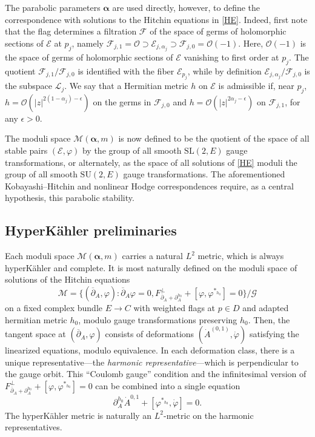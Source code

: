 \documentclass[12pt,letterpaper,reqno]{amsart}
\def\mathbf#1{#1}%
\theoremstyle{remark}
\theoremstyle{definition}
\numberwithin{thm}{section}
\numberwithin{equation}{section}
\numberwithin{figure}{section}
\newcommand{\cL}{\ensuremath{\mathcal L}}
\newcommand{\cF}{\ensuremath{\mathcal F}}
\newcommand{\cO}{\ensuremath{\mathcal O}}
\newcommand{\cE}{{\mathcal E}}
\newcommand{\delbar}{\ensuremath{\overline{\partial}}}
\newcommand{\del}{{\partial}}
\newcommand{\cMam}{\mathcal{M}(\boldsymbol{\alpha}, \mathbf{m})}
\begin{document}
The parabolic parameters $\boldsymbol{\alpha}$ 
are used directly, however, to define the correspondence with solutions to the Hitchin equations in \eqref{HE}.   Indeed, first note that the flag determines a filtration $\cF$ 
of the space of germs of holomorphic sections of $\cE$ at $p_j$, namely $\cF_{j,1} = \cO \supset \cE_{j, \alpha_j} \supset \cF_{j,0} = \cO(-1)$.  Here, $\cO(-1)$ is the space of germs of holomorphic sections of $\cE$ vanishing to first order at $p_j$.
The quotient $\cF_{j,1}/\cF_{j,0}$ is identified with the fiber $\cE_{p_j}$, while by definition $\cE_{j,\alpha_j}/\cF_{j,0}$ is the subspace $\cL_j$.  We say that 
a Hermitian metric $h$ on $\cE$ is admissible if, near $p_j$, $h = \cO( |z|^{2(1-\alpha_j) - \epsilon})$ on the germs in $\cF_{j, 0 }$ and $h = \cO( |z|^{2\alpha_j - \epsilon})$ 
on $\cF_{j,1}$, for any $\epsilon > 0$.   

The moduli space $\cMam$ is now defined to be the quotient of the space of all stable pairs $(\cE, \varphi)$ by the group of all smooth $\mathrm{SL}(2,E)$ 
gauge transformations, or alternately, as the space of all solutions of \eqref{HE} moduli the group of all smooth $\mathrm{SU}(2,E)$ gauge transformations.
The aforementioned Kobayashi--Hitchin and nonlinear Hodge correspondences require, as a central hypothesis, this parabolic stability.

\subsection{HyperK\"ahler preliminaries}
Each moduli space $\cMam$ carries a natural $L^2$ metric, which is always hyperK\"ahler and complete. 
It is most naturally defined on the moduli space of solutions of the Hitchin equations \[\mathcal{M}=\{(\delbar_A, \varphi): \delbar_A \varphi=0, F^\perp_{\delbar_A + \del^{h_0}_A} + [\varphi, \varphi^{*_{h_0}}]=0\}/ \mathcal{G}\]
on a fixed complex bundle $E \to C$ with weighted flags at $p \in D$ and adapted hermitian metric $h_0$, modulo gauge transformations preserving $h_0$.
Then, the tangent space at $(\delbar_A, \varphi)$ consists of deformations $(\dot{A}^{(0,1)}, \dot{\varphi})$ satisfying the linearized equations, modulo equivalence.
In each deformation class, there is a unique representative---the \emph{harmonic representative}---which is perpendicular to the gauge orbit. This ``Coulomb gauge'' condition and the infinitesimal version of  $ F^\perp_{\delbar_A + \del^{h_0}_A} + [\varphi, \varphi^{*_{h_0}}]=0$ can be combined into a single equation 
\begin{equation}
\del_A^{h_0} \dot{A}^{0,1} + [\varphi^{*_{h_0}}, \dot{\varphi}]=0.
\label{eq:harmonic}
\end{equation} The hyperK\"ahler metric is naturally an $L^2$-metric on the harmonic representatives.
\end{document}

